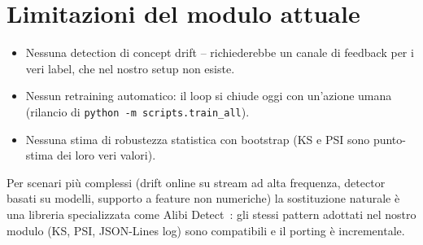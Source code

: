 \section{Limitazioni del modulo attuale}

\begin{itemize}
  \item Nessuna detection di concept drift -- richiederebbe un canale
        di feedback per i veri label, che nel nostro setup non esiste.
  \item Nessun retraining automatico: il loop si chiude oggi con
        un'azione umana (rilancio di
        \texttt{python -m scripts.train\_all}).
  \item Nessuna stima di robustezza statistica con bootstrap (KS e PSI
        sono punto-stima dei loro veri valori).
\end{itemize}

Per scenari più complessi (drift online su stream ad alta frequenza,
detector basati su modelli, supporto a feature non numeriche) la
sostituzione naturale è una libreria specializzata come Alibi
Detect~\cite{breunig2024alibidetect}: gli stessi pattern adottati nel
nostro modulo (KS, PSI, JSON-Lines log) sono compatibili e il
porting è incrementale.
